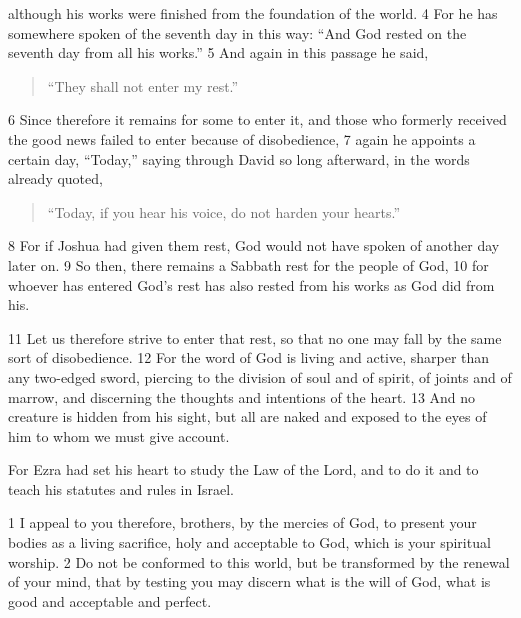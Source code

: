 \begin{bible}
although his works were finished from the foundation of the world. 4 For he has somewhere spoken of the seventh day in this way: ``And God rested on the seventh day from all his works.'' 5 And again in this passage he said,

\begin{quote}
``They shall not enter my rest.''
\end{quote}

6 Since therefore it remains for some to enter it, and those who formerly received the good news failed to enter because of disobedience, 7 again he appoints a certain day, ``Today,'' saying through David so long afterward, in the words already quoted,

\begin{quote}
``Today, if you hear his voice, do not harden your hearts.''
\end{quote}

8 For if Joshua had given them rest, God would not have spoken of another day later on. 9 So then, there remains a Sabbath rest for the people of God, 10 for whoever has entered God's rest has also rested from his works as God did from his.

11 Let us therefore strive to enter that rest, so that no one may fall by the same sort of disobedience. 12 For the word of God is living and active, sharper than any two-edged sword, piercing to the division of soul and of spirit, of joints and of marrow, and discerning the thoughts and intentions of the heart. 13 And no creature is hidden from his sight, but all are naked and exposed to the eyes of him to whom we must give account.

For Ezra had set his heart to study the Law of the Lord, and to do it and to teach his statutes and rules in Israel.

1 I appeal to you therefore, brothers, by the mercies of God, to present your bodies as a living sacrifice, holy and acceptable to God, which is your spiritual worship. 2 Do not be conformed to this world, but be transformed by the renewal of your mind, that by testing you may discern what is the will of God, what is good and acceptable and perfect.

\end{bible}


